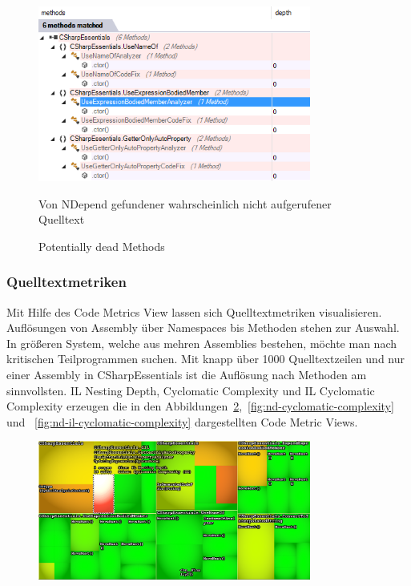 \begin{figure}[ht]
\centering
\includegraphics[width=0.8\textwidth]{images/dead-methods.png}
\caption{Potentially dead Methods}
\vspace{0.1cm}
Von NDepend gefundener wahrscheinlich nicht aufgerufener Quelltext
\label{fig:dead-methods}
\end{figure}

\subsubsection{Quelltextmetriken}
Mit Hilfe des Code Metrics View lassen sich Quelltextmetriken visualisieren. Auflösungen von Assembly über Namespaces bis Methoden stehen zur Auswahl. In größeren System, welche aus mehren Assemblies bestehen, möchte man nach kritischen Teilprogrammen suchen. Mit knapp über 1000 Quelltextzeilen und nur einer Assembly in CSharpEssentials ist die Auflösung nach Methoden am sinnvollsten. IL Nesting Depth, Cyclomatic Complexity und IL Cyclomatic Complexity erzeugen die in den Abbildungen~\ref{fig:nd-il-nesting-depth},~\ref{fig:nd-cyclomatic-complexity} und ~\ref{fig:nd-il-cyclomatic-complexity} dargestellten Code Metric Views.

\begin{figure}[ht]
	\centering
	\includegraphics[width=0.8\textwidth]{images/nd-il-nesting-depth.png}
	\caption{}
	\vspace{0.1cm}
	\label{fig:nd-il-nesting-depth}
\end{figure}

